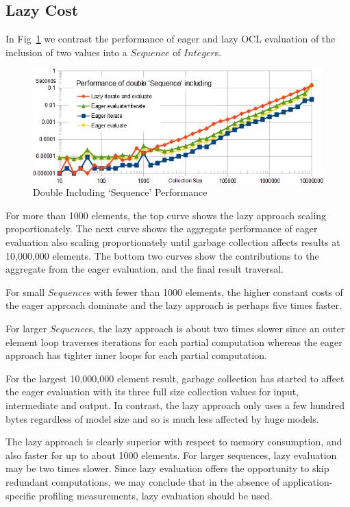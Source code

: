 \documentclass{llncs}
\begin{document}
\subsection{Lazy Cost}

In Fig~\ref{fig:DoubleIncludingPerformance} we contrast the performance of eager and lazy OCL evaluation of the inclusion of two values into a $Sequence$ of $Integer$s. 

\begin{figure}
	\begin{center}
		\includegraphics[width=4.5in]{DoubleIncludingPerformance.png}
	\end{center}
	\caption{Double Including `Sequence' Performance}
	\label{fig:DoubleIncludingPerformance}
\end{figure}

For more than 1000 elements, the top curve shows the lazy approach scaling proportionately. The next curve shows the aggregate performance of eager evaluation also scaling proportionately until garbage collection affects results at 10,000,000 elements. The bottom two curves show the contributions to the aggregate from the eager evaluation, and the final result traversal.

For small $Sequence$s with fewer than 1000 elements, the higher constant costs of the eager approach dominate and the lazy approach is perhaps five times faster.

For larger $Sequence$s, the lazy approach is about two times slower since an outer element loop traverses iterations for each partial computation whereas the eager approach has tighter inner loops for each partial computation.

For the largest 10,000,000 element result, garbage collection has started to affect the eager evaluation with its three full size  collection values for input, intermediate and output. In contrast, the lazy approach only uses a few hundred bytes regardless of model size and so is much less affected by huge models.

The lazy approach is clearly superior with respect to memory consumption, and also faster for up to about 1000 elements. For larger sequences, lazy evaluation may be two times slower. Since lazy evaluation offers the opportunity to skip redundant computations, we may conclude that in the absence of application-specific profiling measurements, lazy evaluation should be used.
\end{document}
